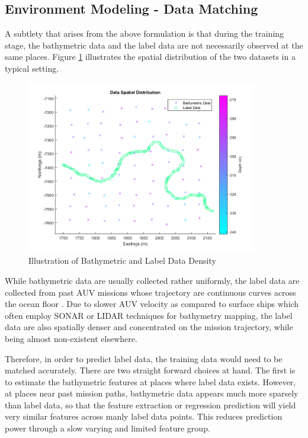 		\FloatBarrier
		
		\subsection{Environment Modeling - Data Matching}
		\label{Background:OceanEnvironmentModeling:DataMatching}
		
			A subtlety that arises from the above formulation is that during the training stage, the bathymetric data and the label data are not necessarily observed at the same places. Figure \ref{Background:OceanEnvironmentModeling:Figure:illustrationBathymetricAgainstLabels} illustrates the spatial distribution of the two datasets in a typical setting.
		
			\begin{figure}[!htbp]
				\centering
					\includegraphics[width=0.9\textwidth]{Figures/illustrationBathymetricAgainstLabels.png}
				\caption{Illustration of Bathymetric and Label Data Density}
				\label{Background:OceanEnvironmentModeling:Figure:illustrationBathymetricAgainstLabels}
			\end{figure}
			
			While bathymetric data are usually collected rather uniformly, the label data are collected from past AUV missions whose trajectory are continuous curves across the ocean floor \cite{Squidle}. Due to slower AUV velocity as compared to surface ships which often employ SONAR or LIDAR techniques for bathymetry mapping, the label data are also spatially denser and concentrated on the mission trajectory, while being almost non-existent elsewhere.
			
			Therefore, in order to predict label data, the training data would need to be matched accurately. There are two straight forward choices at hand. The first is to estimate the bathymetric features at places where label data exists. However, at places near past mission paths, bathymetric data appears much more sparsely than label data, so that the feature extraction or regression prediction will yield very similar features across manly label data points. This reduces prediction power through a slow varying and limited feature group.
			
